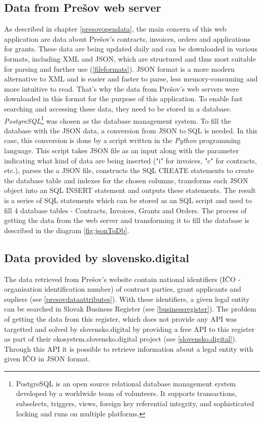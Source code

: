 \documentclass[thesis=B,english]{FITthesis}[2012/06/26]
\begin{document}
	\subsection{Data from Prešov web server}
	As described in chapter \ref{presovopendata}, the main concern of this web application are data about Prešov's contracts, invoices, orders and applications for grants. These data are being updated daily and can be downloaded in various formats, including XML and JSON, which are structured and thus most suitable for parsing and further use (\ref{fileformats}). JSON format is a more modern alternative to XML and is easier and faster to parse, less memory-consuming and more intuitive to read. That's why the data from Prešov's web servers were downloaded in this format for the purpose of this application. To enable fast searching and accessing these data, they need to be stored in a database. \textit{PostgreSQL}\footnote{PostgreSQL is an open source relational database management system developed by a worldwide team of volunteers. It supports transactions, subselects, triggers, views, foreign key referential integrity, and sophisticated locking and runs on multiple platforms.} was chosen as the database management system. To fill the database with the JSON data, a conversion from JSON to SQL is needed. In this case, this conversion is done by a script written in the \textit{Python} programming language. This script takes JSON file as an input along with the parameter indicating what kind of data are being inserted ("i" for invoices, "c" for contracts, etc.), parses the a JSON file, constructs the SQL CREATE statements to create the database table and indexes for the chosen columns, transforms each JSON object into an SQL INSERT statement and outputs these statements. The result is a series of SQL statements which can be stored as an SQL script and used to fill 4 database tables - Contracts, Invoices, Grants and Orders. The process of getting the data from the web server and transforming it to fill the database is described in the diagram \ref{fig:jsonToDb}.

	\subsection{Data provided by slovensko.digital}
	\label{data-slovensko-digital}
	The data retrieved from Prešov's website contain national identifiers (IČO - organisation identification number) of contract parties, grant applicants and supliers (see \ref{presovdataattributes}). With these identifiers, a given legal entity can be searched in Slovak Business Register (see \ref{businessregister}). The problem of getting the data from this register, which does not provide any API was targetted and solved by slovensko.digital by providing a free API to this register as part of their ekosystem.slovensko.digital project (see \ref{slovensko.digital}). Through this API it is possible to retrieve information about a legal entity with given IČO in JSON format. 
	
\end{document}
